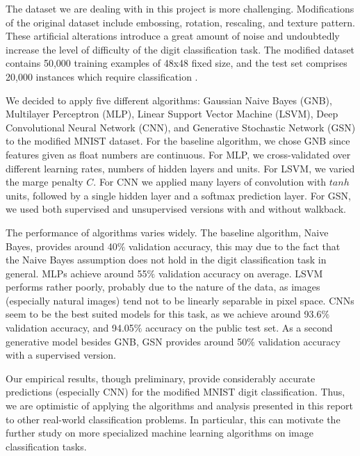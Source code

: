 \documentclass{acm_proc_article-sp}
\begin{document}
The dataset we are dealing with in this project is more challenging. Modifications of the original dataset include embossing, rotation, rescaling, and texture pattern. These artificial alterations introduce a great amount of noise and undoubtedly increase the  level of difficulty of the digit classification task. The modified dataset contains 50,000 training examples of 48x48 fixed size, and the test set comprises 20,000 instances which require classification \cite{comp598p3}.

We decided to apply five different algorithms: Gaussian Naive Bayes (GNB), Multilayer Perceptron (MLP), Linear Support Vector Machine (LSVM), Deep Convolutional Neural Network (CNN), and Generative Stochastic Network (GSN) to the modified MNIST dataset. For the baseline algorithm, we chose GNB since features given as float numbers are continuous. For MLP, we cross-validated over different learning rates, numbers of hidden layers and units. For LSVM, we varied the marge penalty $C$.  For CNN we applied many layers of convolution with $tanh$ units, followed by a single hidden layer and a softmax prediction layer. For GSN, we used both supervised and unsupervised versions with and without walkback.

The performance of algorithms varies widely. The baseline algorithm, Naive Bayes, provides around 40$\%$ validation accuracy, this may due to the fact that the Naive Bayes assumption does not hold in the digit classification task in general. MLPs achieve around 55$\%$ validation accuracy on average. LSVM performs rather poorly, probably due to the nature of the data, as images (especially natural images) tend not to be linearly separable in pixel space. CNNs seem to be the best suited models for this task, as we achieve around 93.6$\%$ validation accuracy, and 94.05$\%$ accuracy on the public test set. As a second generative model besides GNB, GSN provides around 50$\%$ validation accuracy with a supervised version.

Our empirical results, though preliminary, provide considerably accurate predictions (especially CNN) for the modified MNIST digit classification. Thus, we are optimistic of applying the algorithms and analysis presented in this report to other real-world  classification problems. In particular, this can motivate the further study on more specialized machine learning algorithms on image classification tasks.




\end{document}
